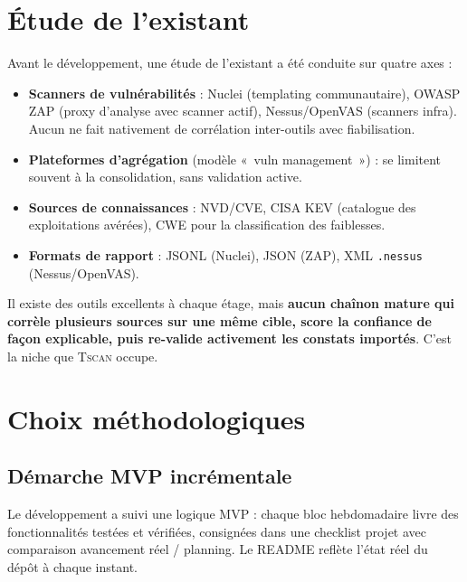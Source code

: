\documentclass[11pt,a4paper]{report}
\newcommand{\tscan}{\textsc{Tscan}}
\newcommand{\code}[1]{\texttt{#1}}
\begin{document}
\chapter{Étude de l'existant}

Avant le développement, une étude de l'existant a été conduite sur quatre axes :

\begin{itemize}[leftmargin=1.5em]
  \item \textbf{Scanners de vulnérabilités} : Nuclei (templating communautaire), OWASP ZAP
        (proxy d'analyse avec scanner actif), Nessus/OpenVAS (scanners infra). Aucun ne
        fait nativement de corrélation inter-outils avec fiabilisation.
  \item \textbf{Plateformes d'agrégation} (modèle «~vuln management~») : se limitent
        souvent à la consolidation, sans validation active.
  \item \textbf{Sources de connaissances} : NVD/CVE, CISA KEV (catalogue des exploitations
        avérées), CWE pour la classification des faiblesses.
  \item \textbf{Formats de rapport} : JSONL (Nuclei), JSON (ZAP), XML \code{.nessus}
        (Nessus/OpenVAS).
\end{itemize}

\begin{aretenir}
Il existe des outils excellents à chaque étage, mais \textbf{aucun chaînon mature qui
corrèle plusieurs sources sur une même cible, score la confiance de façon explicable, puis
re-valide activement les constats importés}. C'est la niche que \tscan{} occupe.
\end{aretenir}

\chapter{Choix méthodologiques}

\section{Démarche MVP incrémentale}

Le développement a suivi une logique MVP : chaque bloc hebdomadaire livre des
fonctionnalités testées et vérifiées, consignées dans une checklist projet avec comparaison
avancement réel / planning. Le README reflète l'état réel du dépôt à chaque instant.
\end{document}
